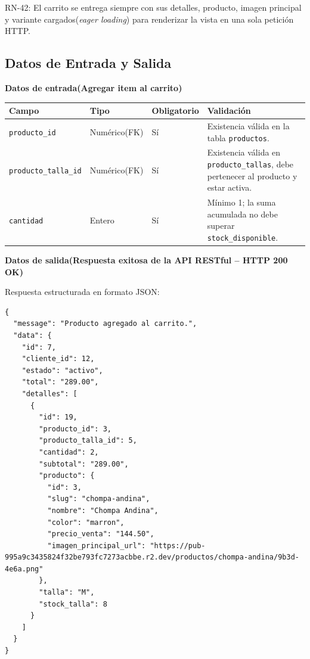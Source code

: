 \documentclass[12pt,a4paper]{article}
\begin{document}
RN-42: El carrito se entrega siempre con sus detalles, producto, imagen principal y variante cargados(\textit{eager loading}) para renderizar la vista en una sola petición HTTP.

\subsection*{Datos de Entrada y Salida}

\textbf{Datos de entrada(Agregar item al carrito)}

\begin{center}
\small
\begin{tabularx}{\textwidth}{p{3.2cm} p{2.8cm} p{1.8cm} L}
\toprule
\textbf{Campo} & \textbf{Tipo} & \textbf{Obligatorio} & \textbf{Validación} \\
\midrule
\texttt{producto\_id} & Numérico(FK) & Sí & Existencia válida en la tabla \texttt{productos}. \\
\texttt{producto\_talla\_id} & Numérico(FK) & Sí & Existencia válida en \texttt{producto\_tallas}, debe pertenecer al producto y estar activa. \\
\texttt{cantidad} & Entero & Sí & Mínimo 1; la suma acumulada no debe superar \texttt{stock\_disponible}. \\
\bottomrule
\end{tabularx}
\end{center}

\textbf{Datos de salida(Respuesta exitosa de la API RESTful -- HTTP 200 OK)}

Respuesta estructurada en formato JSON:

\begin{lstlisting}
{
  "message": "Producto agregado al carrito.",
  "data": {
    "id": 7,
    "cliente_id": 12,
    "estado": "activo",
    "total": "289.00",
    "detalles": [
      {
        "id": 19,
        "producto_id": 3,
        "producto_talla_id": 5,
        "cantidad": 2,
        "subtotal": "289.00",
        "producto": {
          "id": 3,
          "slug": "chompa-andina",
          "nombre": "Chompa Andina",
          "color": "marron",
          "precio_venta": "144.50",
          "imagen_principal_url": "https://pub-995a9c3435824f32be793fc7273acbbe.r2.dev/productos/chompa-andina/9b3d-4e6a.png"
        },
        "talla": "M",
        "stock_talla": 8
      }
    ]
  }
}
\end{lstlisting}
\end{document}
